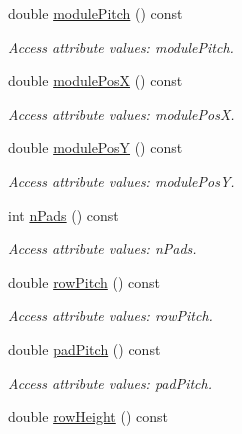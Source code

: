 \begin{DoxyCompactItemize}
double \hyperlink{struct_d_d4hep_1_1_x_m_l_1_1_dimension_acafbea14ea3d6f79405054d3105babba}{modulePitch} () const 
\begin{DoxyCompactList}\small\item\em Access attribute values: modulePitch. \item\end{DoxyCompactList}\item 
double \hyperlink{struct_d_d4hep_1_1_x_m_l_1_1_dimension_a9c659e0db8c3ae82c39a27774768acf7}{modulePosX} () const 
\begin{DoxyCompactList}\small\item\em Access attribute values: modulePosX. \item\end{DoxyCompactList}\item 
double \hyperlink{struct_d_d4hep_1_1_x_m_l_1_1_dimension_a916a7a7ffeac1b7fa8a60ec0e92d9503}{modulePosY} () const 
\begin{DoxyCompactList}\small\item\em Access attribute values: modulePosY. \item\end{DoxyCompactList}\item 
int \hyperlink{struct_d_d4hep_1_1_x_m_l_1_1_dimension_adfcddfed059d44f9a531a62703b4df3f}{nPads} () const 
\begin{DoxyCompactList}\small\item\em Access attribute values: nPads. \item\end{DoxyCompactList}\item 
double \hyperlink{struct_d_d4hep_1_1_x_m_l_1_1_dimension_acb7a7b6142039a142d3cbe749b1d5a43}{rowPitch} () const 
\begin{DoxyCompactList}\small\item\em Access attribute values: rowPitch. \item\end{DoxyCompactList}\item 
double \hyperlink{struct_d_d4hep_1_1_x_m_l_1_1_dimension_a00e0ef45a039dcc5b3d4ce4f30e453ac}{padPitch} () const 
\begin{DoxyCompactList}\small\item\em Access attribute values: padPitch. \item\end{DoxyCompactList}\item 
double \hyperlink{struct_d_d4hep_1_1_x_m_l_1_1_dimension_a4a4d36baaccaaebbcee82cb336b02a89}{rowHeight} () const 

\end{DoxyCompactItemize}
